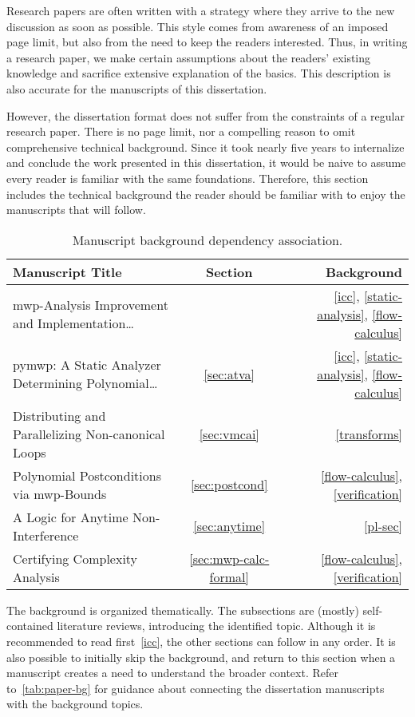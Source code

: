 
Research papers are often written with a strategy where they arrive to the new discussion as soon as possible.
This style comes from awareness of an imposed page limit, but also from the need to keep the readers interested.
Thus, in writing a research paper, we make certain assumptions about the readers' existing knowledge and sacrifice extensive explanation of the basics.
This description is also accurate for the manuscripts of this dissertation.

However, the dissertation format does not suffer from the constraints of a regular research paper.
There is no page limit, nor a compelling reason to omit comprehensive technical background.
Since it took nearly five years to internalize and conclude the work presented in this dissertation, it would be naive to assume every reader is familiar with the same foundations.
Therefore, this section includes the technical background the reader should be familiar with to enjoy the manuscripts that will follow.

\begin{table}[h!]
\begin{NiceTabularX}{\linewidth}{@{}Xcr@{}}
\toprule
\textbf{Manuscript Title} & \textbf{Section} & \textbf{Background} \\
\midrule
{mwp-Analysis Improvement and Implementation\ldots}
    & 
    & \ref{icc}, \ref{static-analysis}, \ref{flow-calculus} \\
{pymwp: A Static Analyzer Determining Polynomial\ldots}
    & \ref{sec:atva}
    & \ref{icc}, \ref{static-analysis}, \ref{flow-calculus} \\
{Distributing and Parallelizing Non-canonical Loops}
    & \ref{sec:vmcai}
    & \ref{transforms} \\
{Polynomial Postconditions via mwp-Bounds}
    & \ref{sec:postcond}
    & \ref{flow-calculus}, \ref{verification} \\
{A Logic for Anytime Non-Interference}
    & \ref{sec:anytime}
    & \ref{pl-sec} \\
{Certifying Complexity Analysis}
    & \ref{sec:mwp-calc-formal}
    & \ref{flow-calculus}, \ref{verification} \\
\bottomrule
\end{NiceTabularX}
\caption[Manuscript background dependency association]{Manuscript background dependency association.}
\label{tab:paper-bg}
\end{table}

The background is organized thematically.
The subsections are (mostly) self-contained literature reviews, introducing the identified topic.
Although it is recommended to read first~\autoref{icc}, the other sections can follow in any order.
It is also possible to initially skip the background, and return to this section when a manuscript creates a need to understand the broader context.
Refer to~\autoref{tab:paper-bg} for guidance about connecting the dissertation manuscripts with the background topics.
